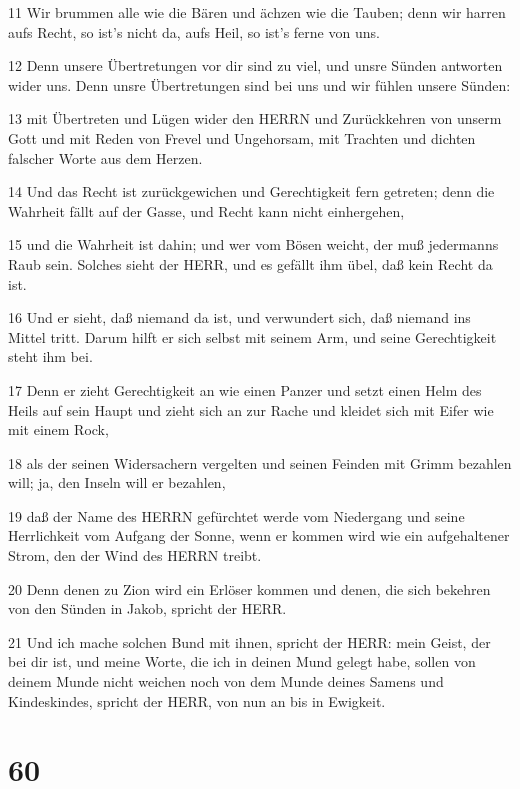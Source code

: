 \par 11 Wir brummen alle wie die Bären und ächzen wie die Tauben; denn wir harren aufs Recht, so ist's nicht da, aufs Heil, so ist's ferne von uns.
\par 12 Denn unsere Übertretungen vor dir sind zu viel, und unsre Sünden antworten wider uns. Denn unsre Übertretungen sind bei uns und wir fühlen unsere Sünden:
\par 13 mit Übertreten und Lügen wider den HERRN und Zurückkehren von unserm Gott und mit Reden von Frevel und Ungehorsam, mit Trachten und dichten falscher Worte aus dem Herzen.
\par 14 Und das Recht ist zurückgewichen und Gerechtigkeit fern getreten; denn die Wahrheit fällt auf der Gasse, und Recht kann nicht einhergehen,
\par 15 und die Wahrheit ist dahin; und wer vom Bösen weicht, der muß jedermanns Raub sein. Solches sieht der HERR, und es gefällt ihm übel, daß kein Recht da ist.
\par 16 Und er sieht, daß niemand da ist, und verwundert sich, daß niemand ins Mittel tritt. Darum hilft er sich selbst mit seinem Arm, und seine Gerechtigkeit steht ihm bei.
\par 17 Denn er zieht Gerechtigkeit an wie einen Panzer und setzt einen Helm des Heils auf sein Haupt und zieht sich an zur Rache und kleidet sich mit Eifer wie mit einem Rock,
\par 18 als der seinen Widersachern vergelten und seinen Feinden mit Grimm bezahlen will; ja, den Inseln will er bezahlen,
\par 19 daß der Name des HERRN gefürchtet werde vom Niedergang und seine Herrlichkeit vom Aufgang der Sonne, wenn er kommen wird wie ein aufgehaltener Strom, den der Wind des HERRN treibt.
\par 20 Denn denen zu Zion wird ein Erlöser kommen und denen, die sich bekehren von den Sünden in Jakob, spricht der HERR.
\par 21 Und ich mache solchen Bund mit ihnen, spricht der HERR: mein Geist, der bei dir ist, und meine Worte, die ich in deinen Mund gelegt habe, sollen von deinem Munde nicht weichen noch von dem Munde deines Samens und Kindeskindes, spricht der HERR, von nun an bis in Ewigkeit.

\chapter{60}

